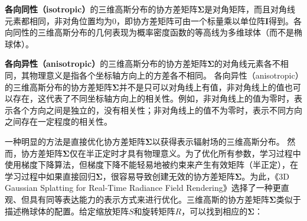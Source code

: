 \documentclass[UTF8,a4paper,12pt]{article}
\begin{document}
\textbf{各向同性（isotropic）}的三维高斯分布的协方差矩阵$\bm{\Sigma}$是对角矩阵，而且对角线元素都相同，非对角位置均为0，即协方差矩阵可由一个标量乘以单位阵$\bm{I}$得到。各向同性的三维高斯分布的几何表现为概率密度函数的等高线为多维球体（而不是椭球体）。


\textbf{各向异性（anisotropic）}的三维高斯分布的协方差矩阵$\bm{\Sigma}$的对角线元素各不相同，其物理意义是指各个坐标轴方向上的方差各不相同。 各向异性（anisotropic）的三维高斯分布的协方差矩阵$\bm{\Sigma}$并不是只可以对角线上有值，非对角线上的值也可以存在，这代表了不同坐标轴方向上的相关性。例如，非对角线上的值为零时，表示各个方向之间是独立的，没有相关性；非对角线上的值不为零时，表示不同方向之间存在一定程度的相关性。


一种明显的方法是直接优化协方差矩阵$\bm{\Sigma}$以获得表示辐射场的三维高斯分布。 然而，协方差矩阵$\bm{\Sigma}$仅在半正定时才具有物理意义。为了优化所有参数，学习过程中使用梯度下降算法，但梯度下降不能轻易地被约束来产生有效矩阵（半正定），在学习过程中如果直接回归$\bm{\Sigma}$，很容易导致创建无效的协方差矩阵$\bm{\Sigma}$。为此，《3D Gaussian Splatting for Real-Time Radiance Field Rendering》选择了一种更直观、但具有同等表达能力的表示方式来进行优化。三维高斯的协方差矩阵$\bm{\Sigma}$类似于描述椭球体的配置。给定缩放矩阵$S$和旋转矩阵$R$，可以找到相应的$\bm{\Sigma}$：
\end{document}
